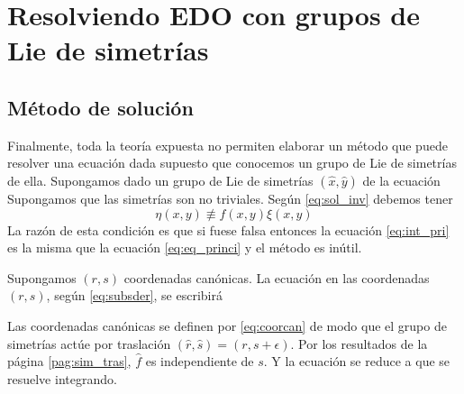 \section{Resolviendo EDO con grupos de Lie de simetrías}
\subsection{Método de solución}
Finalmente, toda la teoría expuesta no permiten elaborar un método que puede resolver una ecuación dada supuesto que conocemos un grupo de Lie de simetrías de ella.  Supongamos dado  un grupo de Lie de simetrías $(\hat{x},\hat{y})$ de la ecuación
 Supongamos  que las simetrías son no triviales. Según \eqref{eq:sol_inv} debemos tener
 \[\eta(x,y)\not\equiv f(x,y)\xi(x,y)\]
La razón de esta condición es que si fuese falsa entonces la ecuación \eqref{eq:int_pri} es la misma que la ecuación \eqref{eq:eq_princi} y el método es inútil.

Supongamos $(r,s)$ coordenadas canónicas. La ecuación en las coordenadas $(r,s)$, según \eqref{eq:subsder}, se escribirá

Las coordenadas canónicas se definen por \eqref{eq:coorcan} de modo que el grupo de simetrías actúe por traslación $(\hat{r},\hat{s})=(r,s+\epsilon)$.
Por los resultados de la página  \ref{pag:sim_tras}, $\hat{f}$ es independiente de $s$. Y la ecuación se reduce a
que se resuelve integrando.


